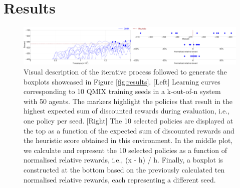 \section{Results}\label{sec:ch5_results}

\begin{figure}
    \centering
    \includegraphics[width=\textwidth]{tex_thesis/figures/ch5/plot_explain_plot_gaussian.pdf}
    \caption{Visual description of the iterative process followed to generate the boxplots showcased in Figure \ref{fig:results}.
[Left] Learning curves corresponding to 10 QMIX training seeds in a k-out-of-n system with 50 agents. 
The markers highlight the policies that result in the highest expected sum of discounted rewards during evaluation, i.e., one policy per seed.
[Right] The 10 selected policies are displayed at the top as a function of the expected sum of discounted rewards and the heuristic score obtained in this environment.
In the middle plot, we calculate and represent the 10 selected policies as a function of normalised relative rewards, i.e., (x - h) / h.
Finally, a boxplot is constructed at the bottom based on the previously calculated ten normalised relative rewards, each representing a different seed.
}
\label{fig:explain_fig}
\end{figure}


